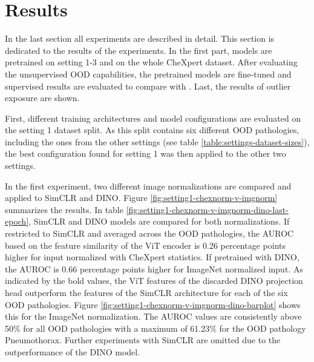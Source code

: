 \section{Results}
\label{section: results}
In the last section all experiments are described in detail.
This section is dedicated to the results of the experiments.
In the first part, models are pretrained on setting 1-3 and on the whole CheXpert dataset.
After evaluating the unsupervised OOD capabilities, the pretrained models are fine-tuned and supervised results are evaluated to compare with \citep{Berger2021}.
Last, the results of outlier exposure are shown.
\par
First, different training architectures and model configurations are evaluated on the setting 1 dataset split.
As this split contains six different OOD pathologies, including the ones from the other settings (see table \ref{table:settings-dataset-sizes}), the best configuration found for setting 1 was then applied to the other two settings.
\par
In the first experiment, two different image normalizations are compared and applied to SimCLR and DINO.
Figure \ref{fig:setting1-chexnorm-v-imgnorm} summarizes the results.
In table \ref{fig:setting1-chexnorm-v-imgnorm-dino-last-epoch}, SimCLR and DINO models are compared for both normalizations.
If restricted to SimCLR and averaged across the OOD pathologies, the AUROC based on the feature similarity of the ViT encoder is 0.26 percentage points higher for input normalized with CheXpert statistics.
If pretrained with DINO, the AUROC is 0.66 percentage points higher for ImageNet normalized input.
As indicated by the bold values, the ViT features of the discarded DINO projection head outperform the features of the SimCLR architecture for each of the six OOD pathologies.
Figure \ref{fig:setting1-chexnorm-v-imgnorm-dino-barplot} shows this for the ImageNet normalization.
The AUROC values are consistently above 50\% for all OOD pathologies with a maximum of 61.23\% for the OOD pathology Pneumothorax.
Further experiments with SimCLR are omitted due to the outperformance of the DINO model.

